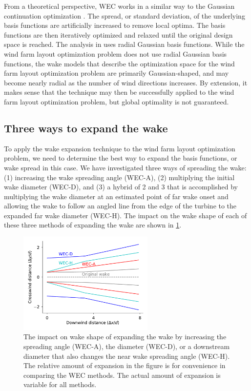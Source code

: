\documentclass[a4paper]{jpconf}
\begin{document}
From a theoretical perspective, WEC works in a similar way to the Gaussian continuation optimization \cite{mobahi2015}. The spread, or standard deviation, of the underlying basis functions are artificially increased to remove local optima. The basis functions are then iteratively optimized and relaxed until the original design space is reached. The analysis in \cite{mobahi2015} uses radial Gaussian basis functions. While the wind farm layout optimization problem does not use radial Gaussian basis functions, the wake models that describe the optimization space for the wind farm layout optimization problem are primarily Gaussian-shaped, and may become nearly radial as the number of wind directions increases. By extension, it makes sense that the technique may then be successfully applied to the wind farm layout optimization problem, but global optimality is not guaranteed.

\subsection{Three ways to expand the wake}\label{sec:wecmethods} 
To apply the wake expansion technique to the wind farm layout optimization problem, we need to determine the best way to expand the basis functions, or wake spread in this case. We have investigated three ways of spreading the wake: (1) increasing the wake spreading angle (WEC-A), (2) multiplying the initial wake diameter (WEC-D), and (3) a hybrid of 2 and 3 that is accomplished by multiplying the wake diameter at an estimated point of far wake onset and allowing the wake to follow an angled line from the edge of the turbine to the expanded far wake diameter (WEC-H). The impact on the wake shape of each of these three methods of expanding the wake  are shown in \cref{fig:wec-methods}.

\begin{figure}[h]
	\centering
	\includegraphics[width=0.6\textwidth]{wec-methods}
	\caption{The impact on wake shape of expanding the wake by increasing the spreading angle (WEC-A), the diameter (WEC-D), or a downstream diameter that also changes the near wake spreading angle (WEC-H). The relative amount of expansion in the figure is for convenience in comparing the WEC methods. The actual amount of expansion is variable for all methods.}
	\label{fig:wec-methods}
\end{figure}
\end{document}
